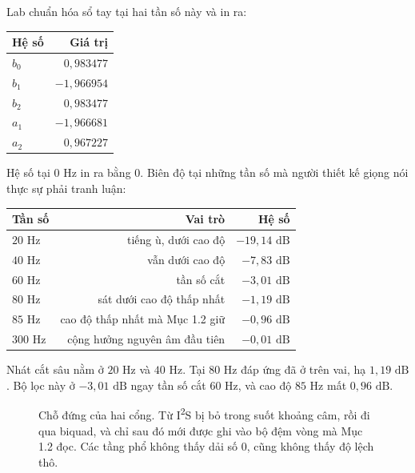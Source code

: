 \documentclass[11pt,a4paper]{article}
\begin{document}
Lab chuẩn hóa sổ tay tại hai tần số này và in ra:

\begin{center}
\begin{tabular}{lr}
\toprule
Hệ số & Giá trị \\
\midrule
$b_0$ & $0{,}983477$ \\
$b_1$ & $-1{,}966954$ \\
$b_2$ & $0{,}983477$ \\
$a_1$ & $-1{,}966681$ \\
$a_2$ & $0{,}967227$ \\
\bottomrule
\end{tabular}
\end{center}

Hệ số tại $0\text{ Hz}$ in ra bằng $0$. Biên độ tại những tần số mà người thiết kế giọng nói thực sự phải tranh luận:

\begin{center}
\begin{tabular}{lrr}
\toprule
Tần số & Vai trò & Hệ số \\
\midrule
$20\text{ Hz}$ & tiếng ù, dưới cao độ & $-19{,}14\text{ dB}$ \\
$40\text{ Hz}$ & vẫn dưới cao độ & $-7{,}83\text{ dB}$ \\
$60\text{ Hz}$ & tần số cắt & $-3{,}01\text{ dB}$ \\
$80\text{ Hz}$ & sát dưới cao độ thấp nhất & $-1{,}19\text{ dB}$ \\
$85\text{ Hz}$ & cao độ thấp nhất mà Mục 1.2 giữ & $-0{,}96\text{ dB}$ \\
$300\text{ Hz}$ & cộng hưởng nguyên âm đầu tiên & $-0{,}01\text{ dB}$ \\
\bottomrule
\end{tabular}
\end{center}

Nhát cắt sâu nằm ở $20\text{ Hz}$ và $40\text{ Hz}$. Tại $80\text{ Hz}$ đáp ứng đã ở trên vai, hạ $1{,}19\text{ dB}$. Bộ lọc này ở $-3{,}01\text{ dB}$ ngay tần số cắt $60\text{ Hz}$, và cao độ $85\text{ Hz}$ mất $0{,}96\text{ dB}$.

\begin{figure}[ht]
\centering

\caption{Chỗ đứng của hai cổng. Từ I\textsuperscript{2}S bị bỏ trong suốt khoảng câm, rồi đi qua biquad, và chỉ sau đó mới được ghi vào bộ đệm vòng mà Mục 1.2 đọc. Các tầng phổ không thấy dải số 0, cũng không thấy độ lệch thô.}
\end{figure}
\end{document}
